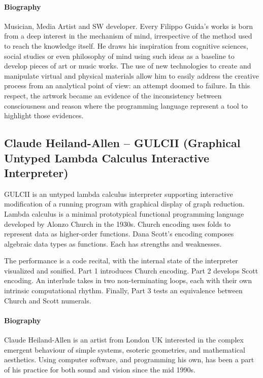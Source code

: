 \documentclass[sigplan,10pt,review]{acmart}\settopmatter{printfolios=true}
\begin{document}
\paragraph{Biography} Musician, Media Artist and SW developer. Every Filippo Guida’s works
is born from a deep interest in the mechanism of mind, irrespective of
the method used to reach the knowledge itself.  He draws his
inspiration from cognitive sciences, social studies or even philosophy
of mind using such ideas as a baseline to develop pieces of art or
music works.  The use of new technologies to create and manipulate
virtual and physical materials allow him to easily address the
creative process from an analytical point of view: an attempt doomed
to failure.  In this respect, the artwork became an evidence of the
inconsistency between consciousness and reason where the programming
language represent a tool to highlight those evidences.


\subsection{Claude Heiland-Allen -- GULCII (Graphical Untyped Lambda Calculus Interactive Interpreter)}

GULCII is an untyped lambda calculus interpreter supporting interactive
modification of a running program with graphical display of graph reduction.
Lambda calculus is a minimal prototypical functional programming language
developed by Alonzo Church in the 1930s.  Church encoding uses folds to
represent data as higher-order functions.  Dana Scott's encoding composes
algebraic data types as functions.  Each has strengths and weaknesses.

The performance is a code recital, with the internal state of the interpreter
visualized and sonified.  Part 1 introduces Church encoding.  Part 2 develops
Scott encoding.  An interlude takes in two non-terminating loops, each with
their own intrinsic computational rhythm.  Finally, Part 3 tests an equivalence
between Church and Scott numerals.

\paragraph{Biography}

Claude Heiland-Allen is an artist from London UK interested in the complex
emergent behaviour of simple systems, esoteric geometries, and mathematical
aesthetics.  Using computer software, and programming his own, has been a
part of his practice for both sound and vision since the mid 1990s.
\end{document}
